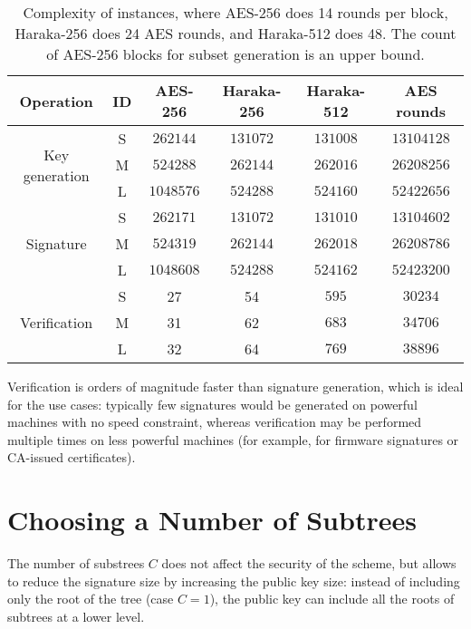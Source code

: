 \begin{table}
\centering 
\begin{tabular}{cc|ccc|c}
\toprule
Operation & ID & AES-256 & Haraka-256 & Haraka-512 & AES rounds \\
\midrule
\multirow{3}{*}{Key generation}
& S & $\num{262144}$ & $\num{131072}$ & $\num{131008}$ & $\num{13104128}$ \\
& M & $\num{524288}$ & $\num{262144}$ & $\num{262016}$ & $\num{26208256}$ \\
& L & $\num{1048576}$ & $\num{524288}$ & $\num{524160}$ & $\num{52422656}$ \\
\midrule
\multirow{3}{*}{Signature}
& S & $\num{262171}$ & $\num{131072}$ & $\num{131010}$ & $\num{13104602}$ \\
&M & $\num{524319}$ & $\num{262144}$ & $\num{262018}$ & $\num{26208786}$ \\
&L & $\num{1048608}$ & $\num{524288}$ & $\num{524162}$ & $\num{52423200}$ \\
\midrule
\multirow{3}{*}{Verification} 
& S & 27 & 54 & $595$ & $\num{30234}$ \\
&M & 31 & 62 & $683$ & $\num{34706}$ \\
&L & 32 & 64 & $769$ & $\num{38896}$ \\
\bottomrule
\end{tabular}

\caption{Complexity of \gravity instances, where AES-256 does 14 rounds per block, Haraka-256 does 24 AES rounds, and Haraka-512 does 48. The count of AES-256 blocks for subset generation is an upper bound.}
\label{tab:complexity}
\end{table}

Verification is orders of magnitude faster than signature generation, which is ideal for the \gravity use cases: typically few signatures would be generated on powerful machines with no speed constraint, whereas verification may be performed multiple times on less powerful machines (for example, for firmware signatures or CA-issued certificates).

\section{Choosing a Number of Subtrees}\label{sec:tradeoff}

The number of substrees $C$ does not affect the security of the scheme, but allows to reduce the signature size by increasing the public key size: instead of including only the root of the tree (case $C=1$), the public key can include all the roots of subtrees at a lower level.

